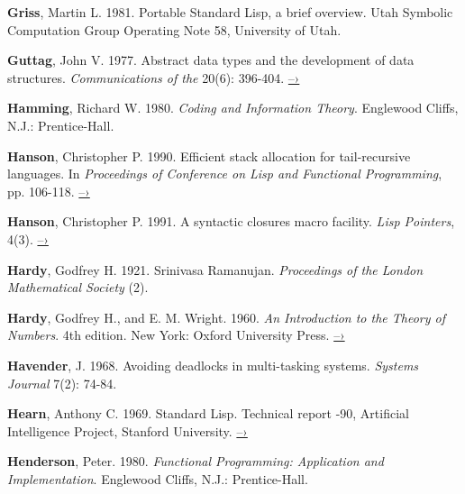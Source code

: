  \label{Griss 1981}
\textbf{Griss}, Martin L.  1981.  Portable Standard Lisp, a brief overview.  Utah
Symbolic Computation Group Operating Note 58, University of Utah.

 \label{Guttag 1977}
\textbf{Guttag}, John V.  1977.  Abstract data types and the development of data
structures.  \textit{Communications of the } 20(6): 396-404.
\href{http://www.unc.edu/~stotts/comp723/guttagADT77.pdf}{–›}

 \label{Hamming 1980}
\textbf{Hamming}, Richard W.  1980.  \textit{Coding and Information Theory}.  Englewood
Cliffs, N.J.: Prentice-Hall.

 \label{Hanson 1990}
\textbf{Hanson}, Christopher P.  1990.  Efficient stack allocation for tail-recur\-sive
languages.  In \textit{Proceedings of  Conference on Lisp and
Functional Programming}, pp. 106-118.
\href{https://groups.csail.mit.edu/mac/ftpdir/users/cph/links.ps.gz}{–›}

 \label{Hanson 1991}
\textbf{Hanson}, Christopher P.  1991.  A syntactic closures macro facility.  \textit{Lisp
Pointers}, 4(3).
\href{http://groups.csail.mit.edu/mac/ftpdir/scheme-reports/synclo.ps}{–›}

 \label{Hardy 1921}
\textbf{Hardy}, Godfrey H.  1921.  Srinivasa Ramanujan.  \textit{Proceedings of the London
Mathematical Society} (2).

 \label{Hardy and Wright 1960}
\textbf{Hardy}, Godfrey H., and E. M. Wright.  1960.  \textit{An Introduction to the
Theory of Numbers}.  4th edition.  New York: Oxford University Press.
\href{https://archive.org/details/AnIntroductionToTheTheoryOfNumbers-4thEd-G.h.HardyE.m.Wright}{–›}

 \label{Havender (1968)}
\textbf{Havender}, J. 1968. Avoiding deadlocks in multi-tasking systems. \textit{
Systems Journal} 7(2): 74-84.

 \label{Hearn 1969}
\textbf{Hearn}, Anthony C.  1969.  Standard Lisp.  Technical report -90,
Artificial Intelligence Project, Stanford University.
\href{http://www.softwarepreservation.org/projects/LISP/stanford/Hearn-StandardLisp-AIM-90.pdf}{–›}

 \label{Henderson 1980}
\textbf{Henderson}, Peter. 1980.  \textit{Functional Programming: Application and
Implementation}. Englewood Cliffs, N.J.: Prentice-Hall.

